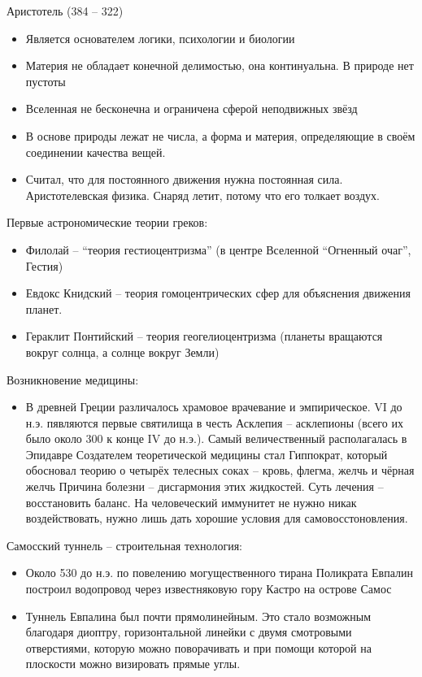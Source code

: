 \documentclass{book}
\theoremstyle{definition}
\begin{document}
    Аристотель (384 -- 322)
    \begin{itemize}
        \item Является основателем логики, психологии и биологии
        \item Материя не обладает конечной делимостью, она континуальна. В природе нет пустоты
        \item Вселенная не бесконечна и ограничена сферой неподвижных звёзд
        \item В основе природы лежат не числа, а форма и материя, определяющие в своём соединении качества вещей.
        \item Считал, что для постоянного движения нужна постоянная сила. Аристотелевская физика. Снаряд летит, потому что его толкает воздух.
    \end{itemize}

    Первые астрономические теории греков:
    \begin{itemize}
        \item Филолай -- ``теория гестиоцентризма'' (в центре Вселенной ``Огненный очаг'', Гестия)
        \item Евдокс Книдский -- теория гомоцентрических сфер для объяснения движения планет.
        \item Гераклит Понтийский -- теория геогелиоцентризма (планеты вращаются вокруг солнца, а солнце вокруг Земли)
    \end{itemize}

    Возникновение медицины:
    \begin{itemize}
        \item  В древней Греции различалось храмовое врачевание и эмпирическое.  VI до н.э. пявляются первые святилища в честь Асклепия -- асклепионы (всего их было около 300 к конце IV до н.э.). Самый величественный располагалась в Эпидавре
            Создателем теоретической медицины стал Гиппократ, который обосновал теорию о четырёх телесных соках -- кровь, флегма, желчь и чёрная желчь
            Причина болезни -- дисгармония этих жидкостей. Суть лечения -- восстановить баланс. На человеческий иммунитет не нужно никак воздействовать, нужно лишь дать хорошие условия для самовосстоновления.
    \end{itemize}
    
    Самосский туннель -- строительная технология:
    \begin{itemize}
        \item  Около 530 до н.э. по повелению могущественного тирана Поликрата Евпалин построил водопровод через известняковую гору Кастро на острове Самос
        \item Туннель Евпалина был почти прямолинейным. Это стало возможным благодаря диоптру, горизонтальной линейки с двумя смотровыми отверстиями, которую можно поворачивать и при помощи которой на плоскости  можно визировать прямые углы.
    \end{itemize}
\end{document}
